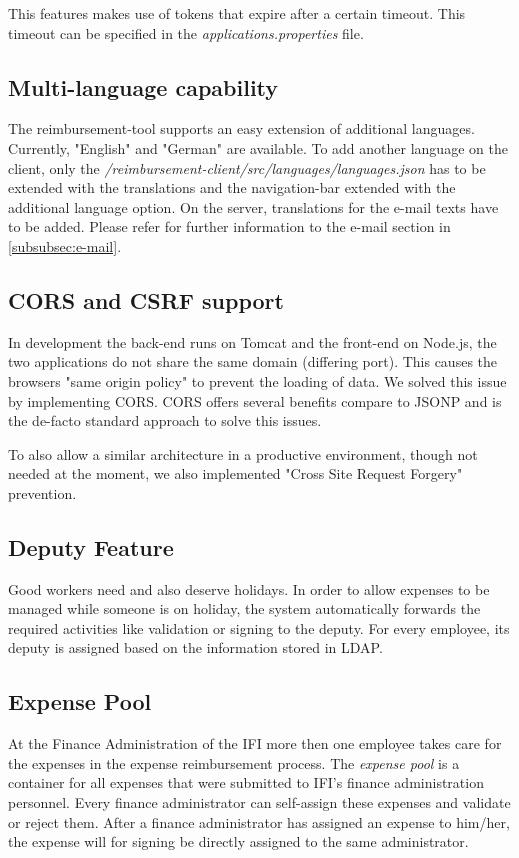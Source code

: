 This features makes use of tokens that expire after a certain timeout. This timeout can be specified in the \textit{applications.properties} file.


\subsection{Multi-language capability}
The reimbursement-tool supports an easy extension of additional languages. Currently, "English" and "German" are available. To add another language on the client, only the \textit{/reimbursement-client/src/languages/languages.json} has to be extended with the translations and the navigation-bar extended with the additional language option. \newline 
On the server, translations for the e-mail texts have to be added. Please refer for further information to the e-mail section in \ref{subsubsec:e-mail}.

\subsection{CORS and CSRF support}
In development the back-end runs on Tomcat and the front-end on Node.js, the two applications do not share the same domain (differing port). This causes the browsers "same origin policy" to prevent the loading of data. We solved this issue by implementing CORS. CORS offers several benefits compare to JSONP and is the de-facto standard approach to solve this issues. \par 

To also allow a similar architecture in a productive environment, though not needed at the moment, we also implemented "Cross Site Request Forgery" prevention.

\subsection{Deputy Feature}
Good workers need and also deserve holidays. In order to allow expenses to be managed while someone is on holiday, the system automatically forwards the required activities like validation or signing to the deputy. For every employee, its deputy is assigned based on the information stored in LDAP.

\subsection{Expense Pool}
At the Finance Administration of the IFI more then one employee takes care for the expenses in the expense reimbursement process. The \textit{expense pool} is a container for all expenses that were submitted to IFI's finance administration personnel. Every finance administrator can self-assign these expenses and validate or reject them. After a finance administrator has assigned an expense to him/her, the expense will for signing be directly assigned to the same administrator.

